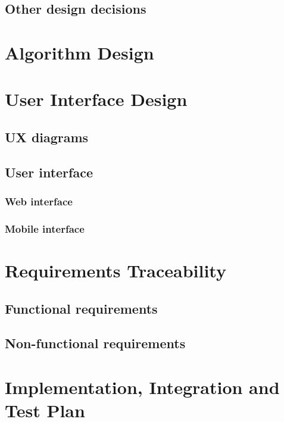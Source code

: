 \documentclass{article}
\begin{document}
	\subsection{Other design decisions}


	\section{Algorithm Design}


	\section{User Interface Design}


	\subsection{UX diagrams}


	\subsection{User interface}


	\subsubsection{Web interface}


	\subsubsection{Mobile interface}


	\section{Requirements Traceability}


	\subsection{Functional requirements}


	\subsection{Non-functional requirements}


	\section{Implementation, Integration and Test Plan}
\end{document}
